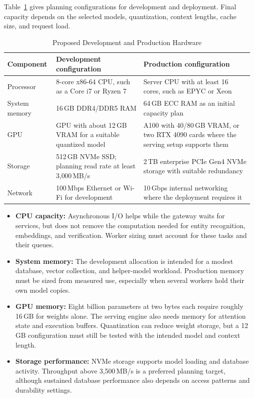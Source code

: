 Table~\ref{tab:hardware_specs} gives planning configurations for development and deployment. Final capacity depends on the selected models, quantization, context lengths, cache size, and request load.
\begin{table}[H]
\centering\small
\begin{tabularx}{\textwidth}{|p{2.4cm}|X|X|}
\hline
\textbf{Component} & \textbf{Development configuration} & \textbf{Production configuration} \\ \hline
Processor & 8-core x86-64 CPU, such as a Core i7 or Ryzen 7 & Server CPU with at least 16 cores, such as EPYC or Xeon \\ \hline
System memory & 16\,GB DDR4/DDR5 RAM & 64\,GB ECC RAM as an initial capacity plan \\ \hline
GPU & GPU with about 12\,GB VRAM for a suitable quantized model & A100 with 40/80\,GB VRAM, or two RTX 4090 cards where the serving setup supports them \\ \hline
Storage & 512\,GB NVMe SSD; planning read rate at least 3{,}000\,MB/s & 2\,TB enterprise PCIe Gen4 NVMe storage with suitable redundancy \\ \hline
Network & 100\,Mbps Ethernet or Wi-Fi for development & 10\,Gbps internal networking where the deployment requires it \\ \hline
\end{tabularx}
\caption{Proposed Development and Production Hardware}
\label{tab:hardware_specs}
\end{table}

\begin{itemize}
    \item \textbf{CPU capacity:} Asynchronous I/O helps while the gateway waits for services, but does not remove the computation needed for entity recognition, embeddings, and verification. Worker sizing must account for these tasks and their queues.
    \item \textbf{System memory:} The development allocation is intended for a modest database, vector collection, and helper-model workload. Production memory must be sized from measured use, especially when several workers hold their own model copies.
    \item \textbf{GPU memory:} Eight billion parameters at two bytes each require roughly 16\,GB for weights alone. The serving engine also needs memory for attention state and execution buffers. Quantization can reduce weight storage, but a 12\,GB configuration must still be tested with the intended model and context length.
    \item \textbf{Storage performance:} NVMe storage supports model loading and database activity. Throughput above 3{,}500\,MB/s is a preferred planning target, although sustained database performance also depends on access patterns and durability settings.
\end{itemize}

